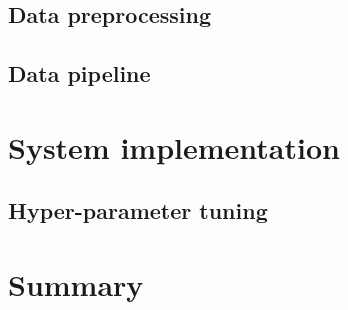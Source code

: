 \documentclass[thesis.tex]{subfiles}
\begin{document}
\subsection{Data preprocessing}

\subsection{Data pipeline}






\section{System implementation} \label{sec:system_implementation}

\subsection{Hyper-parameter tuning}





\section{Summary} \label{sec:C3-summary}
\end{document}
